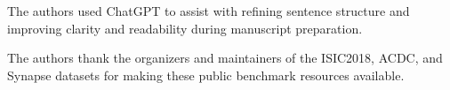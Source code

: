 The authors used ChatGPT to assist with refining sentence structure and improving clarity and readability during manuscript preparation.

The authors thank the organizers and maintainers of the ISIC2018, ACDC, and Synapse datasets for making these public benchmark resources available.
